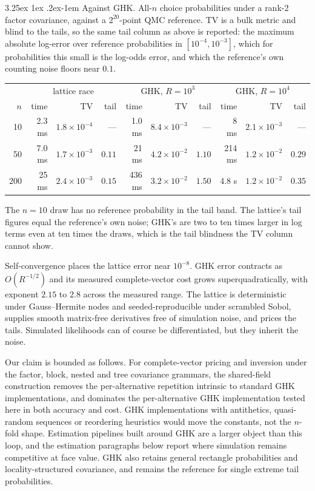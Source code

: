 \documentclass[11pt]{article}
\makeatletter
\renewcommand\paragraph{\@startsection{paragraph}{4}{\z@}%
  {3.25ex \@plus1ex \@minus.2ex}{-1em}%
  {\normalfont\normalsize\itshape}}
\makeatother
\begin{document}
\paragraph{Against GHK.} All-$n$ choice probabilities under a rank-2 factor
covariance, against a $2^{20}$-point QMC reference. TV is a bulk metric and
blind to the tails, so the same tail column as above is reported: the
maximum absolute log-error over reference probabilities in
$[10^{-4},10^{-3}]$, which for probabilities this small is the log-odds
error, and which the reference's own counting noise floors near $0.1$.

\begin{center}\small
\setlength{\tabcolsep}{4pt}
\begin{tabular}{rrrrrrrrrr}
\toprule
& \multicolumn{3}{c}{lattice race} & \multicolumn{3}{c}{GHK, $R=10^3$} & \multicolumn{3}{c}{GHK, $R=10^4$}\\
$n$ & time & TV & tail & time & TV & tail & time & TV & tail\\
\midrule
10  & 2.3 ms & $1.8\times10^{-4}$ & --- & 1.0 ms & $8.4\times10^{-3}$ & --- & 8 ms & $2.1\times10^{-3}$ & ---\\
50  & 7.0 ms & $1.7\times10^{-3}$ & $0.11$ & 21 ms & $4.2\times10^{-2}$ & $1.10$ & 214 ms & $1.2\times10^{-2}$ & $0.29$\\
200 & 25 ms  & $2.4\times10^{-3}$ & $0.15$ & 436 ms & $3.2\times10^{-2}$ & $1.50$ & 4.8 s & $1.2\times10^{-2}$ & $0.35$\\
\bottomrule
\end{tabular}
\end{center}

The $n=10$ draw has no reference probability in the tail band. The
lattice's tail figures equal the reference's own noise; GHK's are two to
ten times larger in log terms even at ten times the draws, which is the
tail blindness the TV column cannot show.

Self-convergence places the lattice error near $10^{-8}$. GHK error
contracts as $O(R^{-1/2})$ and its measured complete-vector cost grows
superquadratically, with exponent $2.15$ to $2.8$ across the measured
range. The lattice is deterministic under Gauss--Hermite nodes and
seeded-reproducible under scrambled Sobol, supplies smooth matrix-free
derivatives free of simulation noise, and prices the tails. Simulated
likelihoods can of course be differentiated, but they inherit the noise.

Our claim is bounded as follows. For complete-vector pricing and
inversion under the factor, block, nested and tree covariance grammars,
the shared-field construction removes the per-alternative repetition
intrinsic to standard GHK implementations, and dominates the
per-alternative GHK implementation tested here in both accuracy and cost.
GHK implementations with antithetics, quasi-random sequences or
reordering heuristics would move the constants, not the $n$-fold shape.
Estimation pipelines built around GHK are a larger object than this loop,
and the estimation paragraphs below report where simulation remains
competitive at face value. GHK also retains general rectangle
probabilities and locality-structured covariance, and \citet{botev2017}
remains the reference for single extreme tail probabilities.
\end{document}
